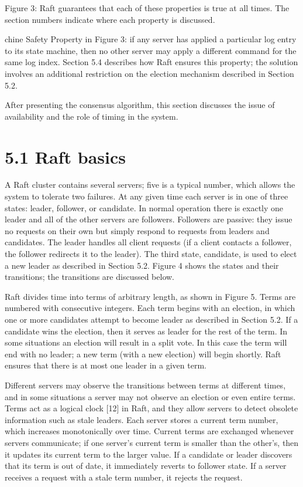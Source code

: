 \documentclass[
]{article}
\begin{document}
Figure 3: Raft guarantees that each of these properties is true at all
times. The section numbers indicate where each property is discussed.

chine Safety Property in Figure 3: if any server has applied a
particular log entry to its state machine, then no other server may
apply a different command for the same log index. Section 5.4 describes
how Raft ensures this property; the solution involves an additional
restriction on the election mechanism described in Section 5.2.

After presenting the consensus algorithm, this section discusses the
issue of availability and the role of timing in the system.

\section{5.1 Raft basics}\label{raft-basics}

A Raft cluster contains several servers; five is a typical number, which
allows the system to tolerate two failures. At any given time each
server is in one of three states: leader, follower, or candidate. In
normal operation there is exactly one leader and all of the other
servers are followers. Followers are passive: they issue no requests on
their own but simply respond to requests from leaders and candidates.
The leader handles all client requests (if a client contacts a follower,
the follower redirects it to the leader). The third state, candidate, is
used to elect a new leader as described in Section 5.2. Figure 4 shows
the states and their transitions; the transitions are discussed below.

Raft divides time into terms of arbitrary length, as shown in Figure 5.
Terms are numbered with consecutive integers. Each term begins with an
election, in which one or more candidates attempt to become leader as
described in Section 5.2. If a candidate wins the election, then it
serves as leader for the rest of the term. In some situations an
election will result in a split vote. In this case the term will end
with no leader; a new term (with a new election) will begin shortly.
Raft ensures that there is at most one leader in a given term.

Different servers may observe the transitions between terms at different
times, and in some situations a server may not observe an election or
even entire terms. Terms act as a logical clock {[}12{]} in Raft, and
they allow servers to detect obsolete information such as stale leaders.
Each server stores a current term number, which increases monotonically
over time. Current terms are exchanged whenever servers communicate; if
one server's current term is smaller than the other's, then it updates
its current term to the larger value. If a candidate or leader discovers
that its term is out of date, it immediately reverts to follower state.
If a server receives a request with a stale term number, it rejects the
request.
\end{document}
